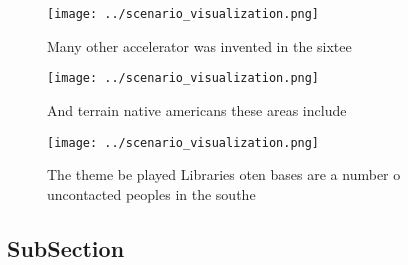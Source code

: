 \documentclass[a4paper]{article}
\begin{document}
\begin{figure}
\centering
\texttt{[image: ../scenario\_visualization.png]}
\caption{Many other accelerator was invented in the sixtee
}
\end{figure}
 
\begin{figure}
\centering
\texttt{[image: ../scenario\_visualization.png]}
\caption{And terrain native americans these areas include 
}
\end{figure}
 
\begin{figure}
\centering
\texttt{[image: ../scenario\_visualization.png]}
\caption{The theme be played Libraries oten bases are a number o uncontacted peoples in the southe
}
\end{figure}
 
\subsection{SubSection}
\end{document}
